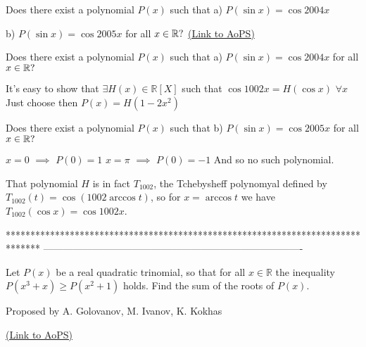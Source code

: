 \begin{problem}
	Does there exist a polynomial $P(x)$ such that
a) $P(\sin x) = \cos 2004 x$

b) $P(\sin x) = \cos 2005 x$  for all $ x \in  \Bbb{R}?$
	\flushright \href{https://artofproblemsolving.com/community/c6h489396}{(Link to AoPS)}
\end{problem}



\begin{solution}
	\begin{tcolorbox}Does there exist a polynomial $P(x)$ such that
a) $P(\sin x) = \cos 2004 x$  for all $ x \in  \Bbb{R}?$\end{tcolorbox}It's easy to show that $\exists H(x)\in\mathbb R[X]$ such that $\cos 1002x=H(\cos x)$ $\forall x$
Just choose then $P(x)=H(1-2x^2)$

\begin{tcolorbox}Does there exist a polynomial $P(x)$ such that
b) $P(\sin x) = \cos 2005 x$  for all $ x \in  \Bbb{R}?$\end{tcolorbox}$x=0$ $\implies$ $P(0)=1$
$x=\pi$ $\implies$ $P(0)=-1$
And so no such polynomial.
\end{solution}



\begin{solution}
	That polynomial $H$ is in fact $T_{1002}$, the Tchebysheff polynomyal defined by $T_{1002}(t) = \cos(1002\arccos t)$, so for $x=\arccos t$ we have $T_{1002} (\cos x) = \cos 1002 x$.
\end{solution}
*******************************************************************************
-------------------------------------------------------------------------------

\begin{problem}
	Let $P(x)$ be a real quadratic trinomial, so that for all $x\in \mathbb{R}$ the inequality $P(x^3+x)\geq P(x^2+1)$ holds. Find the sum of the roots of $P(x)$.

\begin{italicized}Proposed by A. Golovanov, M. Ivanov, K. Kokhas\end{italicized}
	\flushright \href{https://artofproblemsolving.com/community/c6h489900}{(Link to AoPS)}
\end{problem}



